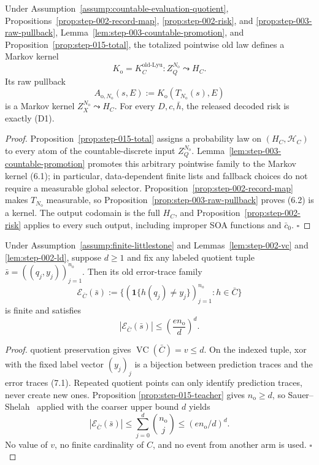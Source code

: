 \begin{proposition}\label{prop:step-015-kernel}
Under Assumption~\ref{assump:countable-evaluation-quotient}, 
Propositions~\ref{prop:step-002-record-map},
\ref{prop:step-002-risk}, and
\ref{prop:step-003-raw-pullback}, Lemma~\ref{lem:step-003-countable-promotion}, and
Proposition~\ref{prop:step-015-total}, the totalized pointwise old law
defines a Markov kernel
\[
K_{\mathrm o}=K_C^{\mathrm{old\text{-}Lyu}}:
Z_Q^{N_{\mathrm o}}\leadsto H_C.
\tag{6.1}
\]
Its raw pullback
\[
A_{\mathrm o,N_{\mathrm o}}(s,E)
:=K_{\mathrm o}(T_{N_{\mathrm o}}(s),E)
\tag{6.2}
\]
is a Markov kernel
\(Z_X^{N_{\mathrm o}}\leadsto H_C\). For every \(D,c,\bar h\),
the released decoded risk is exactly (D1).


\end{proposition}

\begin{proof}
Proposition~\ref{prop:step-015-total} assigns a probability law on
\((H_C,\mathcal H_C)\) to every atom of the countable-discrete input
\(Z_Q^{N_{\mathrm o}}\). Lemma~\ref{lem:step-003-countable-promotion} promotes this arbitrary
pointwise family to the Markov kernel (6.1); in particular, data-dependent
finite lists and fallback choices do not require a measurable global
selector. Proposition~\ref{prop:step-002-record-map} makes
\(T_{N_{\mathrm o}}\) measurable, so Proposition~\ref{prop:step-003-raw-pullback} proves (6.2) is a kernel.
The output codomain is the full \(H_C\), and Proposition~\ref{prop:step-002-risk} applies to every such output,
including improper SOA functions and \(\bar c_0\). \(\square\)


\end{proof}

\begin{lemma}\label{lem:step-015-traces}
Under Assumption~\ref{assump:finite-littlestone} and 
Lemmas~\ref{lem:step-002-vc} and \ref{lem:step-002-ld}, suppose \(d\ge1\)
and fix any labeled quotient tuple
\(\bar s=((q_j,y_j))_{j=1}^{n_{\mathrm o}}\). Then its old error-trace
family
\[
\mathcal E_{\bar C}(\bar s)
:=\{(\mathbf1\{h(q_j)\ne y_j\})_{j=1}^{n_{\mathrm o}}:
h\in\bar C\}
\tag{7.1}
\]
is finite and satisfies
\[
|\mathcal E_{\bar C}(\bar s)|
\le\left(\frac{en_{\mathrm o}}d\right)^d.
\tag{7.2}
\]


\end{lemma}

\begin{proof}
 quotient preservation gives
\(\operatorname{VC}(\bar C)=v\le d\). On the indexed tuple, xor with the
fixed label vector \((y_j)_j\) is a bijection between prediction traces and
the error traces (7.1). Repeated quotient points can only identify
prediction traces, never create new ones. Proposition
\ref{prop:step-015-teacher} gives \(n_{\mathrm o}\ge d\), so
Sauer--Shelah~\citep{sauer1972} applied with the coarser upper bound \(d\) yields
\[
|\mathcal E_{\bar C}(\bar s)|
\le\sum_{j=0}^d\binom{n_{\mathrm o}}j
\le(en_{\mathrm o}/d)^d.
\]
No value of \(v\), no finite cardinality of \(C\), and no event from
another arm is used. \(\square\)


\end{proof}

